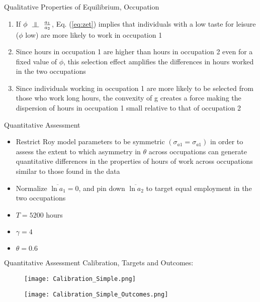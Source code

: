 \documentclass[hyperref={bookmarks=false}]{beamer}
\newcommand{\indep}{\rotatebox[origin=c]{90}{$\models$}}
\begin{document}
\begin{frame}{Qualitative Properties of Equilibrium, Occupation}
\begin{enumerate}
\setlength{\itemsep}{0.35 cm}
\item If $\phi \,\,\,\, \indep \,\,\,\, \frac{a_{1}}{a_{2}}$, Eq. (\ref{eq:zet}) implies that individuals with a low taste for leisure ($\phi$ low) are
more likely to work in occupation 1
\item Since hours in occupation 1 are higher than hours in occupation 2 even for a fixed value of $\phi$, this selection effect amplifies the differences in hours worked in the two occupations
\item Since individuals working in occupation 1 are more likely to be selected from those who work long hours, the convexity of g creates a force making the dispersion of hours in occupation 1 small relative to that of occupation 2
\end{enumerate}
\end{frame}

\begin{frame}{Quantitative Assessment}
\begin{itemize}
\setlength{\itemsep}{0.35 cm}
\item Restrict Roy model parameters to be symmetric $(\sigma_{a1}=\sigma_{a1})$ in order to assess the extent to which asymmetry in $\theta$ across occupations can generate quantitative differences in the properties of hours of work across occupations similar to those found in the data
\item Normalize $\overline{\ln a_1}=0$, and pin down $\overline{\ln a_2}$ to target equal employment in the two occupations
\item $T=5200$ hours
\item $\gamma=4$
\item $\theta=0.6$
\end{itemize}
\end{frame}

\begin{frame}{Quantitative Assessment}
Calibration, Targets and Outcomes:
\begin{figure}[!t]
\centering
\begin{minipage}[b]{0.4\textwidth}{}
\centering
\texttt{[image: Calibration\_Simple.png]}
\end{minipage}
\begin{minipage}[b]{0.55\textwidth}{}
\centering
\texttt{[image: Calibration\_Simple\_Outcomes.png]}
\end{minipage}
\end{figure}
\end{frame}
\end{document}
